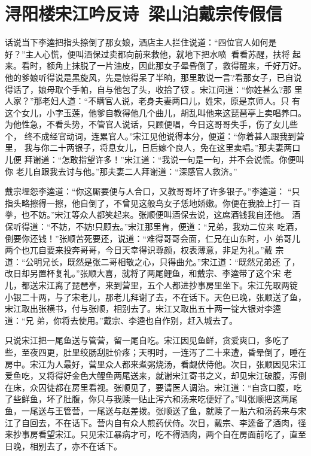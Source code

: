 \chapter{浔阳楼宋江吟反诗~梁山泊戴宗传假信}

话说当下李逵把指头捺倒了那女娘，酒店主人拦住说道：“四位官人如何是
好？”主人心慌，便叫酒保过卖都向前来救他，就地下把水喷，看看苏醒，扶将
起来。看时，额角上抹脱了一片油皮，因此那女子晕昏倒了，救得醒来，千好万好。
他的爹娘听得说是黑旋风，先是惊得呆了半晌，那里敢说一言?看那女子，已自说
得话了，娘母取个手帕，自与他包了头，收拾了钗。宋江问道：“你姓甚么?那
里人家？”那老妇人道：“不瞒官人说，老身夫妻两口儿，姓宋，原是京师人。只
有这个女儿，小字玉莲，他爹自教得他几个曲儿，胡乱叫他来这琵琶亭上卖唱养口。
为他性急，不看头势，不管官人说话，只顾便唱，今日这哥哥失手，伤了女儿些个，
终不成经官动词，连累官人。”宋江见他说得本分，便道：“你着甚人跟我到营里，
我与你二十两银子，将息女儿，日后嫁个良人，免在这里卖唱。”那夫妻两口儿便
拜谢道：“怎敢指望许多！”宋江道：“我说一句是一句，并不会说慌。你便叫你
老儿自跟我去讨与他。”那夫妻二人拜谢道：“深感官人救济。”

戴宗埋怨李逵道：“你这厮要便与人合口，又教哥哥坏了许多银子。”李逵道：
“只指头略擦得一擦，他自倒了，不曾见这般鸟女子恁地娇嫩。你便在我脸上打一
百拳，也不妨。”宋江等众人都笑起来。张顺便叫酒保去说，这席酒钱我自还他。
酒保听得道：“不妨，不妨!只顾去。”宋江那里肯，便道：“兄弟，我劝二位来
吃酒，倒要你还钱！”张顺苦死要还，说道：“难得哥哥会面，仁兄在山东时，小
弟哥儿两个也兀自要来投奔哥哥，今日天幸得识尊颜，权表薄意，非足为礼。”戴
宗道：“公明兄长，既然是张二哥相敬之心，只得曲允。”宋江道：“既然兄弟还
了，改日却另置杯复礼。”张顺大喜，就将了两尾鲤鱼，和戴宗、李逵带了这个宋
老儿，都送宋江离了琵琶亭，来到营里，五个人都进抄事房里坐下。宋江先取两锭
小银二十两，与了宋老儿，那老儿拜谢了去，不在话下。天色已晚，张顺送了鱼，
宋江取出张横书，付与张顺，相别去了。宋江又取出五十两一锭大银对李逵道：“兄
弟，你将去使用。”戴宗、李逵也自作别，赶入城去了。

只说宋江把一尾鱼送与管营，留一尾自吃。宋江因见鱼鲜，贪爱爽口，多吃了
些，至夜四更，肚里绞肠刮肚价疼；天明时，一连泻了二十来遭，昏晕倒了，睡在
房中。宋江为人最好，营里众人都来煮粥烧汤，看觑伏侍他。次日，张顺因见宋江
爱鱼吃，又将得好金色大鲤鱼两尾送来，就谢宋江寄书之义，却见宋江破腹，泻倒
在床，众囚徒都在房里看视。张顺见了，要请医人调治。宋江道：“自贪口腹，吃
了些鲜鱼，坏了肚腹，你只与我赎一贴止泻六和汤来吃便好了。”叫张顺把这两尾
鱼，一尾送与王管营，一尾送与赵差拨。张顺送了鱼，就赎了一贴六和汤药来与宋
江了自回去，不在话下。营内自有众人煎药伏侍。次日，戴宗、李逵备了酒肉，径
来抄事房看望宋江。只见宋江暴病才可，吃不得酒肉，两个自在房面前吃了，直至
日晚，相别去了，亦不在话下。

